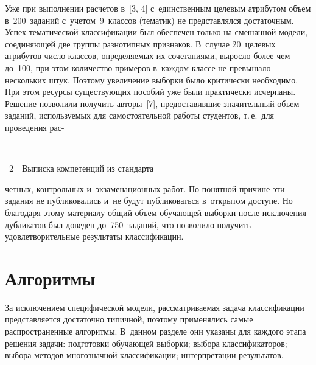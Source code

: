 \begin{multicols}{2}
      Уже при выполнении расчетов в~[3, 4] с~единственным целевым 
атрибутом объем в~200~заданий с~учетом~9~классов (тематик) не 
представлялся достаточным. Успех тематической \mbox{классификации} был 
обеспечен только на смешанной модели, соединяющей две группы 
разнотипных признаков. В~случае 20~целевых атрибутов число классов, 
определяемых их сочетаниями, выросло более чем до~100, при этом 
количество примеров в~каждом классе не превышало нескольких штук. 
Поэтому увеличение выборки было критически необходимо. При этом 
ресурсы существующих пособий уже были практически исчерпаны. Решение 
позволили получить авторы~[7], предоставившие значительный объем 
заданий, используемых для самостоятельной работы студентов, т.\,е.\ для 
проведения рас-\linebreak\vspace*{-12pt}

{ \begin{center}  %
 \vspace*{6pt}
    \mbox{%
\epsfxsize=79mm 
}

\vspace*{6pt}

\noindent
{{\figurename~2}\ \ \small{Выписка компетенций из стандарта
}}
\end{center}
}


\addtocounter{figure}{1}

\pagebreak


\noindent
четных, контрольных и~экзаменационных работ. По понятной 
причине эти задания не публиковались и~не будут публиковаться в~открытом 
доступе. Но благодаря этому материалу общий объем обучающей выборки 
после исключения дубликатов был доведен до~750~заданий, что позволило 
получить удовлетворительные результаты клас\-си\-фи\-ка\-ции.
{

}
      
\section{Алгоритмы}

      За исключением специфической модели, рассматриваемая задача 
классификации представляется достаточно типичной, поэтому применялись 
самые распространенные алгоритмы. В~данном разделе они указаны для 
каждого этапа решения задачи: подготовки обучающей выборки; выбора 
классификаторов; выбора методов многозначной классификации; 
интерпретации результатов.
      

\end{multicols}
